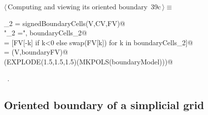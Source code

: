 \documentclass[11pt,oneside]{article}	%
\begin{document}
\begin{flushleft} \small \label{scrap78}
\protect{}$\langle\,$Computing and viewing its oriented boundary\nobreak\ {\footnotesize 39c}$\,\rangle\equiv$
\vspace{-1ex}
\begin{list}{}{} \item
\mbox{}\verb@boundaryCells_2 = signedBoundaryCells(V,CV,FV)@\\
\mbox{}\verb@print "\nboundaryCells_2 =\n", boundaryCells_2@\\
\mbox{}\verb@boundaryFV = [FV[-k] if k<0 else swap(FV[k]) for k in boundaryCells_2]@\\
\mbox{}\verb@boundaryModel = (V,boundaryFV)@\\
\mbox{}\verb@VIEW(EXPLODE(1.5,1.5,1.5)(MKPOLS(boundaryModel)))@\\
\mbox{}\verb@@{\NWsep}
\end{list}
\vspace{-1ex}
\footnotesize\addtolength{\baselineskip}{-1ex}
\begin{list}{}{\setlength{\itemsep}{-\parsep}\setlength{\itemindent}{-\leftmargin}}
\item \NWtxtMacroRefIn\ .
\end{list}
\end{flushleft}

\subsection{Oriented boundary of a simplicial grid}
\end{document}

